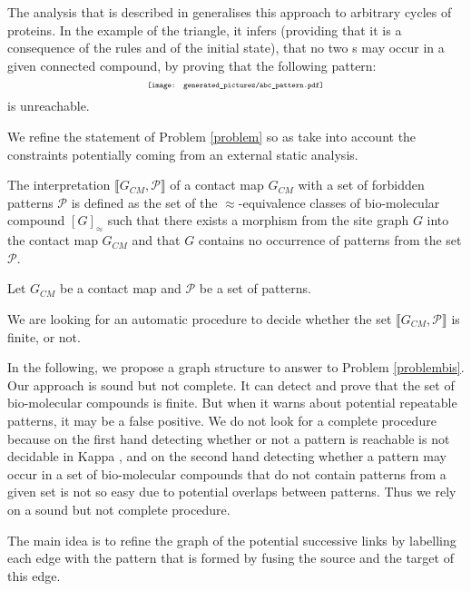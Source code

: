 \documentclass{entcs}
\newcommand{\graphsymb}{G}
\newcommand{\iso}{\approx}
\begin{document}
The analysis that is described in \cite{afp} generalises this approach to arbitrary cycles of proteins. In the example of the triangle, it infers (providing that it is a consequence of the rules and of the initial state), that no two s may occur in a given connected compound, by proving that the following pattern:
\begin{equation*}
\scalebox{0.6}{\texttt{[image: generated\_pictures/abc\_pattern.pdf]}}
\end{equation*}
is unreachable.

We refine the statement of Problem \ref{problem} so as take into account the constraints potentially coming from an external static analysis.


\begin{defn}
The interpretation $\llbracket \graphsymb_{\textit{CM}}, \mathcal{P}\rrbracket$ of a contact map $\graphsymb_{\textit{CM}}$ with a set of forbidden patterns $\mathcal{P}$ is defined as the set of the $\iso$-equivalence classes of bio-molecular compound $[G]_{\iso}$ such that there exists a morphism from the site graph $G$ into the contact map $\graphsymb_{\textit{CM}}$ and that $G$ contains no occurrence of patterns from the set $\mathcal{P}$.
\end{defn}
\begin{problem}\label{problembis}
Let $\graphsymb_{\textit{CM}}$ be a contact map and $\mathcal{P}$ be a set of patterns.

We are looking for an automatic procedure to decide whether
the set $\llbracket \graphsymb_{\textit{CM}},\mathcal{P} \rrbracket$ is finite, or not.
\end{problem}

In the following, we propose a graph structure to answer to Problem \ref{problembis}. Our approach is sound but not complete. It can detect and prove that the set of bio-molecular compounds is finite. But when it warns about potential repeatable patterns, it may be a false positive. We do not look for a complete procedure because on the first hand detecting whether or not a pattern is reachable is not decidable in Kappa \cite{kreyBig}, and on the second hand detecting whether a pattern may occur in a set of bio-molecular compounds that do not contain patterns from a given set is not so easy due to potential overlaps between patterns. Thus we rely on a sound but not complete procedure.

The main idea is to refine the graph of the potential successive links by labelling each edge with the pattern that is formed by fusing the source and the target of this edge.
\end{document}
